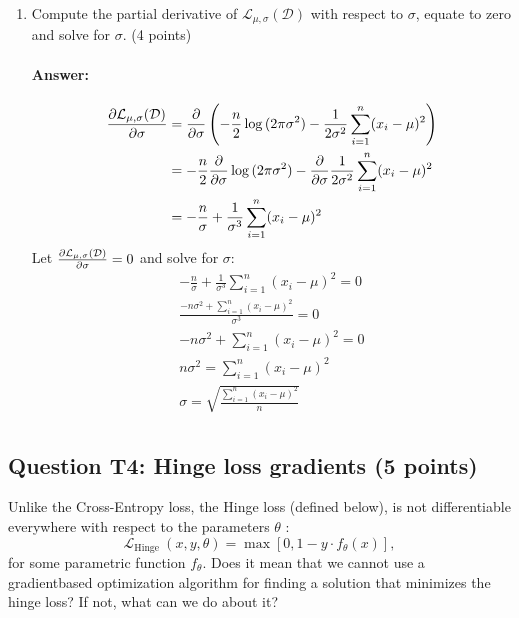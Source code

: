 \documentclass[10pt]{article}
\begin{document}
\begin{enumerate}
  \item Compute the partial derivative of $\mathcal{L}_{\mu, \sigma}(\mathcal{D})$ with respect to $\sigma$, equate to zero and solve for $\sigma$. (4 points)
  \paragraph{Answer:}
  \begin{align*}
    \pdv{\mathcal{L}_{\mu, \sigma}(\mathcal{D})}{\sigma } &= \pdv{}{\sigma} \left(-\frac{n}{2}\log{(2\pi \sigma^2)}-\frac{1}{2\sigma^2}\sum_{i=1}^n (x_i-\mu )^{2}\right)\\
    &= -\frac{n}{2}\pdv{}{\sigma}\log{(2\pi \sigma^2)}-\pdv{}{\sigma}\frac{1}{2\sigma^2}\sum_{i=1}^n (x_i-\mu )^{2}\\
     &= -\frac{n}{\sigma} + \frac{1}{\sigma^3}\sum_{i=1}^n (x_i-\mu )^{2}
  \end{align*}
  Let $\pdv{\mathcal{L}_{\mu, \sigma}(\mathcal{D})}{\sigma}=0$ and solve for $\sigma$:
  \begin{align*}
    -\frac{n}{\sigma} + \frac{1}{\sigma^3}\sum_{i=1}^n (x_i-\mu )^{2} = 0\\
    \frac{-n\sigma^2 + \sum_{i=1}^n (x_i-\mu )^{2}}{\sigma^3} = 0\\
    -n\sigma^2 + \sum_{i=1}^n (x_i-\mu )^{2} = 0\\
    n\sigma^2 = \sum_{i=1}^n (x_i-\mu )^{2}\\
    \sigma = \boxed{\sqrt{\frac{\sum_{i=1}^n (x_i-\mu )^{2}}{n}}}\\
  \end{align*}
\end{enumerate}
\subsection*{Question T4: Hinge loss gradients (5 points)}
Unlike the Cross-Entropy loss, the Hinge loss (defined below), is not differentiable everywhere with respect to the parameters $\theta$ :
$$
\mathcal{L}_{\text {Hinge }}(x, y, \theta)=\max \left[0,1-y \cdot f_{\theta}(x)\right],
$$
for some parametric function $f_{\theta}$. Does it mean that we cannot use a gradientbased optimization algorithm for finding a solution that minimizes the hinge loss? If not, what can we do about it?
\end{document}
